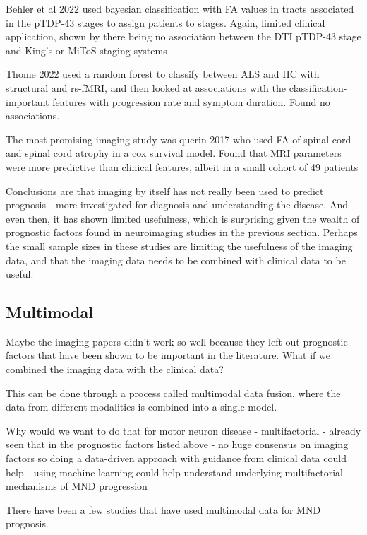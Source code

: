 Behler et al 2022 used bayesian classification with FA values in tracts associated in the pTDP-43 stages to assign patients to stages.
Again, limited clinical application, shown by there being no association between the DTI pTDP-43 stage and King's or MiToS staging systems

Thome 2022 used a random forest to classify between ALS and HC with structural and rs-fMRI, and then looked at associations with the classification-important features with progression rate and symptom duration.
Found no associations.

The most promising imaging study was querin 2017 who used FA of spinal cord and spinal cord atrophy in a cox survival model.
Found that MRI parameters were more predictive than clinical features, albeit in a small cohort of 49 patients

Conclusions are that imaging by itself has not really been used to predict prognosis - more investigated for diagnosis and understanding the disease.
And even then, it has shown limited usefulness, which is surprising given the wealth of prognostic factors found in neuroimaging studies in the previous section.
Perhaps the small sample sizes in these studies are limiting the usefulness of the imaging data, and that the imaging data needs to be combined with clinical data to be useful.

\subsection{Multimodal}

Maybe the imaging papers didn't work so well because they left out prognostic factors that have been shown to be important in the literature.
What if we combined the imaging data with the clinical data?

This can be done through a process called multimodal data fusion, where the data from different modalities is combined into a single model.

Why would we want to do that for motor neuron disease
- multifactorial
    - already seen that in the prognostic factors listed above
    - no huge consensus on imaging factors so doing a data-driven approach with guidance from clinical data could help
- using machine learning could help understand underlying multifactorial mechanisms of MND progression

There have been a few studies that have used multimodal data for MND prognosis.

